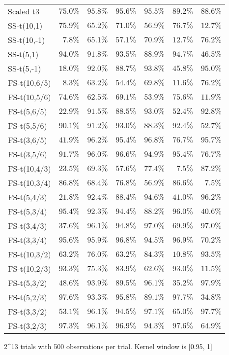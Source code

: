 \begin{longtable}{lrrrrrr}
Scaled t3 & $75.0\%$ & $95.8\%$ & $95.6\%$ & $95.5\%$ & $89.2\%$ & $88.6\%$ \\ 
SS-t(10,1) & $75.9\%$ & $65.2\%$ & $71.0\%$ & $56.9\%$ & $76.7\%$ & $12.7\%$ \\ 
SS-t(10,-1) & $7.8\%$ & $65.1\%$ & $57.1\%$ & $70.9\%$ & $12.7\%$ & $76.2\%$ \\ 
SS-t(5,1) & $94.0\%$ & $91.8\%$ & $93.5\%$ & $88.9\%$ & $94.7\%$ & $46.5\%$ \\ 
SS-t(5,-1) & $18.0\%$ & $92.0\%$ & $88.7\%$ & $93.8\%$ & $45.8\%$ & $95.0\%$ \\ 
FS-t(10,6/5) & $8.3\%$ & $63.2\%$ & $54.4\%$ & $69.8\%$ & $11.6\%$ & $76.2\%$ \\ 
FS-t(10,5/6) & $74.6\%$ & $62.5\%$ & $69.1\%$ & $53.9\%$ & $75.6\%$ & $11.9\%$ \\ 
FS-t(5,6/5) & $22.9\%$ & $91.5\%$ & $88.5\%$ & $93.0\%$ & $52.4\%$ & $92.8\%$ \\ 
FS-t(5,5/6) & $90.1\%$ & $91.2\%$ & $93.0\%$ & $88.3\%$ & $92.4\%$ & $52.7\%$ \\ 
FS-t(3,6/5) & $41.9\%$ & $96.2\%$ & $95.4\%$ & $96.8\%$ & $76.7\%$ & $95.7\%$ \\ 
FS-t(3,5/6) & $91.7\%$ & $96.0\%$ & $96.6\%$ & $94.9\%$ & $95.4\%$ & $76.7\%$ \\ 
FS-t(10,4/3) & $23.5\%$ & $69.3\%$ & $57.6\%$ & $77.4\%$ & $7.5\%$ & $87.2\%$ \\ 
FS-t(10,3/4) & $86.8\%$ & $68.4\%$ & $76.8\%$ & $56.9\%$ & $86.6\%$ & $7.5\%$ \\ 
FS-t(5,4/3) & $21.8\%$ & $92.4\%$ & $88.4\%$ & $94.6\%$ & $41.0\%$ & $96.2\%$ \\ 
FS-t(5,3/4) & $95.4\%$ & $92.3\%$ & $94.4\%$ & $88.2\%$ & $96.0\%$ & $40.6\%$ \\ 
FS-t(3,4/3) & $37.6\%$ & $96.1\%$ & $94.8\%$ & $97.0\%$ & $69.9\%$ & $97.0\%$ \\ 
FS-t(3,3/4) & $95.6\%$ & $95.9\%$ & $96.8\%$ & $94.5\%$ & $96.9\%$ & $70.2\%$ \\ 
FS-t(10,3/2) & $63.2\%$ & $76.0\%$ & $63.2\%$ & $84.3\%$ & $10.8\%$ & $93.5\%$ \\ 
FS-t(10,2/3) & $93.3\%$ & $75.3\%$ & $83.9\%$ & $62.6\%$ & $93.0\%$ & $11.5\%$ \\ 
FS-t(5,3/2) & $48.6\%$ & $93.9\%$ & $89.5\%$ & $96.1\%$ & $35.2\%$ & $97.9\%$ \\ 
FS-t(5,2/3) & $97.6\%$ & $93.3\%$ & $95.8\%$ & $89.1\%$ & $97.7\%$ & $34.8\%$ \\ 
FS-t(3,3/2) & $53.1\%$ & $96.1\%$ & $94.5\%$ & $97.1\%$ & $65.0\%$ & $97.7\%$ \\ 
FS-t(3,2/3) & $97.3\%$ & $96.1\%$ & $96.9\%$ & $94.3\%$ & $97.6\%$ & $64.9\%$ \\ 
\bottomrule
\end{longtable}
\begin{minipage}{\linewidth}
2\textasciicircum{}13 trials with 500 observations per trial. Kernel window is [0.95, 1]\\
\end{minipage}

